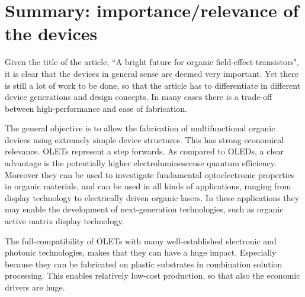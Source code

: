 \section{Summary: importance/relevance of the devices}

Given the title of the article, ``A bright future for organic field-effect transistors", it is clear that the devices in general sense are deemed very important. Yet there is still a lot of work to be done, so that the article has to differentiate in different device generations and design concepts. In many cases there is a trade-off between high-performance and ease of fabrication. 

The general objective is to allow the fabrication of multifunctional organic devices using extremely simple device structures. This has strong economical relevance. OLETs represent a step forwards. As compared to OLEDs, a clear advantage is the potentially higher electroluminescense quantum efficiency. Moreover they can be used to investigate fundamental optoelectronic properties in organic materials, and can be used in all kinds of applications, ranging from display technology to electrically driven organic lasers. In these applications they may enable the development of next-generation technologies, such as organic active matrix display technology. 

The full-compatibility of OLETs with many well-established electronic and photonic technologies, makes that they can have a huge impact. Especially because they can be fabricated on plastic substrates in combination solution processing. This enables relatively low-cost production, so that also the economic drivers are huge.